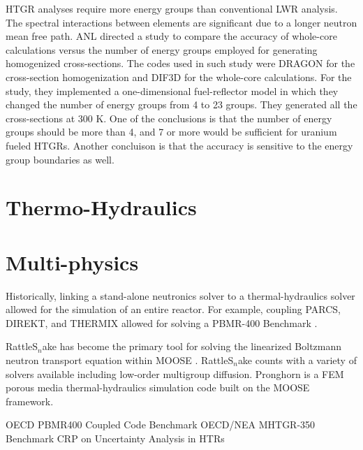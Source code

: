 \documentclass[11pt,letterpaper]{article}
\begin{document}
\gls{HTGR} analyses require more energy groups than conventional \gls{LWR} analysis.
The spectral interactions between elements are significant due to a longer neutron mean free path.
\gls{ANL} directed a study \cite{lee_status_2006} to compare the accuracy of whole-core calculations versus the number of energy groups employed for generating homogenized cross-sections.
The codes used in such study were DRAGON for the cross-section homogenization and DIF3D for the whole-core calculations.
For the study, they implemented a one-dimensional fuel-reflector model in which they changed the number of energy groups from 4 to 23 groups.
They generated all the cross-sections at 300 K.
One of the conclusions is that the number of energy groups should be more than 4, and 7 or more would be sufficient for uranium fueled \glspl{HTGR}.
Another concluison is that the accuracy is sensitive to the energy group boundaries as well.














\section{Thermo-Hydraulics}





\section{Multi-physics}

Historically, linking a stand-alone neutronics solver to a thermal-hydraulics solver allowed for the simulation of an entire reactor.
For example, coupling PARCS, DIREKT, and THERMIX \cite{seker_analysis_2006} allowed for solving a \gls{PBMR}-400 Benchmark \cite{reitsma_oecdneansc_2006}.

RattleS$_n$ake \cite{wang_nonlinear_2013} has become the primary tool for solving the linearized Boltzmann neutron transport equation within \gls{MOOSE} \cite{strydom_inl_2013}.
RattleS$_n$ake counts with a variety of solvers available including low-order multigroup diffusion.
Pronghorn \cite{bingham_pronghorn_2012} \cite{novak_pronghorn_2018} is a \gls{FEM} porous media thermal-hydraulics simulation code built on the \gls{MOOSE} framework.

OECD PBMR400 Coupled Code Benchmark %
OECD/NEA MHTGR-350 Benchmark %
CRP on Uncertainty Analysis in HTRs %
\cite{gougar_htgr_2016}


\pagebreak


\end{document}
